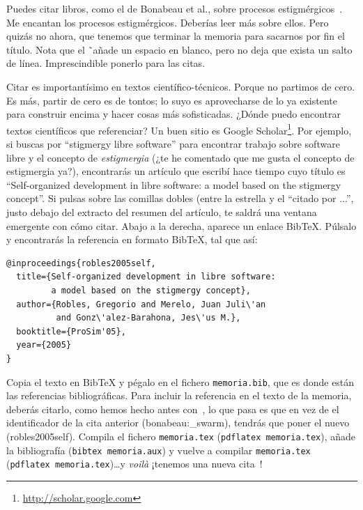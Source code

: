 \documentclass[a4paper, 12pt]{book}
\begin{document}
Puedes citar libros, como el de Bonabeau et al., sobre procesos estigmérgicos~\cite{bonabeau:_swarm}. 
Me encantan los procesos estigmérgicos.
Deberías leer más sobre ellos.
Pero quizás no ahora, que tenemos que terminar la memoria para sacarnos por fin el título.
Nota que el \~ \ añade un espacio en blanco, pero no deja que exista un salto de línea. 
Imprescindible ponerlo para las citas.

Citar es importantísimo en textos científico-técnicos. 
Porque no partimos de cero.
Es más, partir de cero es de tontos; lo suyo es aprovecharse de lo ya existente para construir encima y hacer cosas más sofisticadas.
¿Dónde puedo encontrar textos científicos que referenciar?
Un buen sitio es Google Scholar\footnote{\url{http://scholar.google.com}}.
Por ejemplo, si buscas por ``stigmergy libre software'' para encontrar trabajo sobre software libre y el concepto de \emph{estigmergia} (¿te he comentado que me gusta el concepto de estigmergia ya?), encontrarás un artículo que escribí hace tiempo cuyo título es ``Self-organized development in libre software: a model based on the stigmergy concept''.
Si pulsas sobre las comillas dobles (entre la estrella y el ``citado por ...'', justo debajo del extracto del resumen del artículo, te saldrá una ventana emergente con cómo citar.
Abajo a la derecha, aparece un enlace BibTeX.
Púlsalo y encontrarás la referencia en formato BibTeX, tal que así:

{\footnotesize
\begin{verbatim}
@inproceedings{robles2005self,
  title={Self-organized development in libre software:
         a model based on the stigmergy concept},
  author={Robles, Gregorio and Merelo, Juan Juli\'an 
          and Gonz\'alez-Barahona, Jes\'us M.},
  booktitle={ProSim'05},
  year={2005}
}
\end{verbatim}
}

Copia el texto en BibTeX y pégalo en el fichero \texttt{memoria.bib}, que es donde están las referencias bibliográficas.
Para incluir la referencia en el texto de la memoria, deberás citarlo, como hemos hecho antes con~\cite{bonabeau:_swarm}, lo que pasa es que en vez de el identificador de la cita anterior (bonabeau:\_swarm), tendrás que poner el nuevo (robles2005self).
Compila el fichero \texttt{memoria.tex} (\texttt{pdflatex memoria.tex}), añade la bibliografía (\texttt{bibtex memoria.aux}) y vuelve a compilar \texttt{memoria.tex} (\texttt{pdflatex memoria.tex})\ldots y \emph{voilà} ¡tenemos una nueva cita~\cite{robles2005self}!
\end{document}
